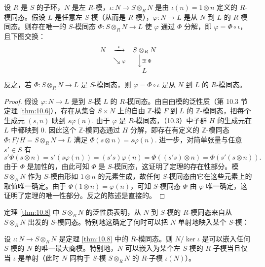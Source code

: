 \begin{theorem}\label{thm:10.8}
设 \(R\) 是 \(S\) 的子环，\(N\) 是左 \(R\)-模，\(\iota : N \to S \otimes_R N\) 是由 \(\iota(n) = 1 \otimes n\) 定义的 \(R\)-模同态。假设 \(L\) 是任意左 \(S\)-模（从而是 \(R\)-模），\(\varphi : N \to L\) 是从 \(N\) 到 \(L\) 的 \(R\)-模同态。则存在唯一的 \(S\)-模同态 \(\Phi : S \otimes_R N \to L\) 使 \(\varphi\) 通过 \(\Phi\) 分解，即 \(\varphi = \Phi \circ \iota\)，且下图交换：
\[
\begin{array}{ccc}
N & \xrightarrow{\ \iota\ } & S \otimes_R N \\
& \searrow{\scriptstyle \varphi} & \Big\downarrow{\scriptstyle \exists!\,\Phi} \\
& & L
\end{array}
\]
反之，若 \(\Phi : S \otimes_R N \to L\) 是 \(S\)-模同态，则 \(\varphi = \Phi \circ \iota\) 是从 \(N\) 到 \(L\) 的 \(R\)-模同态。
\end{theorem}

\begin{proof}
假设 \(\varphi : N \to L\) 是到 \(S\)-模 \(L\) 的 \(R\)-模同态。由自由模的泛性质（第 10.3 节定理 \ref{thm:10.6}），存在从集合 \(S \times N\) 上的自由 \(\mathbb{Z}\)-模 \(F\) 到 \(L\) 的 \(\mathbb{Z}\)-模同态，把每个生成元 \((s, n)\) 映到 \(s\varphi(n)\). 由于 \(\varphi\) 是 \(R\)-模同态，（10.3）中子群 \(H\) 的生成元在 \(L\) 中都映到 0. 因此这个 \(\mathbb{Z}\)-模同态通过 \(H\) 分解，即存在有定义的 \(\mathbb{Z}\)-模同态 \(\Phi : F/H = S \otimes_R N \to L\) 满足 \(\Phi(s \otimes n) = s\varphi(n)\). 进一步，对简单张量与任意 \(s' \in S\) 有
\[
s'\Phi(s \otimes n) = s'(s\varphi(n)) = (s's)\varphi(n) = \Phi((s's) \otimes n) = \Phi(s'(s \otimes n)).
\]
由于 \(\Phi\) 是加性的，由此可知 \(\Phi\) 是 \(S\)-模同态，这证明了定理的存在性部分。模 \(S \otimes_R N\) 作为 \(S\)-模由形如 \(1 \otimes n\) 的元素生成，故任何 \(S\)-模同态由它在这些元素上的取值唯一确定。由于 \(\Phi(1 \otimes n) = \varphi(n)\)，可知 \(S\)-模同态 \(\Phi\) 由 \(\varphi\) 唯一确定，这证明了定理的唯一性部分。反之的陈述是直接的。
\end{proof}

定理 \ref{thm:10.8} 中 \(S \otimes_R N\) 的泛性质表明，从 \(N\) 到 \(S\)-模的 \(R\)-模同态来自从 \(S \otimes_R N\) 出发的 \(S\)-模同态。特别地这确定了何时可以把 \(N\) 单射地映入某个 \(S\)-模：

\begin{corollary}\label{cor:10.9}
设 \(\iota : N \to S \otimes_R N\) 是定理 \ref{thm:10.8} 中的 \(R\)-模同态。则 \(N/\ker\iota\) 是可以嵌入任何 \(S\)-模的 \(N\) 的唯一最大商模。特别地，\(N\) 可以嵌入为某个左 \(S\)-模的 \(R\)-子模当且仅当 \(\iota\) 是单射（此时 \(N\) 同构于 \(S\)-模 \(S \otimes_R N\) 的 \(R\)-子模 \(\iota(N)\)）。
\end{corollary}

